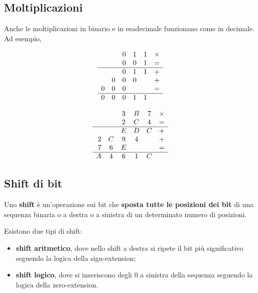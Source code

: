 \documentclass[11pt, a4paper, titlepage, oneside]{scrbook}
\begin{document}
\subsection{Moltiplicazioni}

Anche le moltiplicazioni in binario e in esadecimale funzionano come in decimale. Ad esempio,

\noindent
\begin{minipage}{0.48\textwidth}
\[
\begin{array}{rccccc}
& & 0 & 1 & 1 & \times \\
& & 0 & 0 & 1 & = \\
\hline
& & 0 & 1 & 1 & + \\
& 0 & 0 & 0 & & + \\
0 & 0 & 0 & & & = \\
\hline
0 & 0 & 0 & 1 & 1
\end{array}
\]
\end{minipage}\hfill
\begin{minipage}{0.48\textwidth}
\[
\begin{array}{rccccc}
& & 3 & B & 7 & \times \\
& & 2 & C & 4 & = \\
\hline
& & E & D & C & + \\
2 & C & 9 & 4 & & + \\
7 & 6 & E & & & = \\
\hline
A & 4 & 6 & 1 & C
\end{array}
\]
\end{minipage}

\subsection{Shift di bit}

\begin{Definizione}[Shift]
\label{def-shift}
Uno \textbf{shift} è un'operazione sui bit che \textbf{sposta tutte le posizioni dei bit} di una sequenza binaria o a destra o a sinistra di un determinato numero di posizioni.
\end{Definizione} 

Esistono due tipi di shift:
\begin{itemize}
    \item \textbf{shift aritmetico}, dove nello shift a destra si ripete il bit più significativo seguendo la logica della sign-extension;
    \item \textbf{shift logico}, dove si inseriscono degli 0 a sinistra della sequenza seguendo la logica della zero-extension.
\end{itemize}
\end{document}
